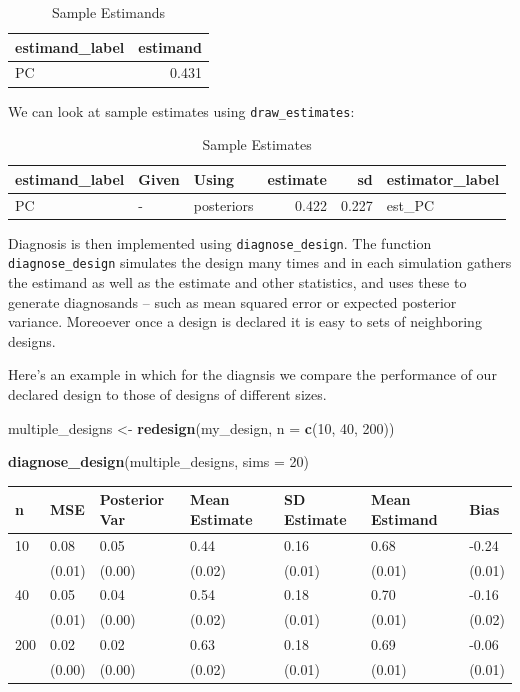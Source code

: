 \documentclass[12pt,]{book}
\newenvironment{Shaded}{\begin{snugshade}}{\end{snugshade}}
\newcommand{\DataTypeTok}[1]{\textcolor[rgb]{0.13,0.29,0.53}{#1}}
\newcommand{\DecValTok}[1]{\textcolor[rgb]{0.00,0.00,0.81}{#1}}
\newcommand{\KeywordTok}[1]{\textcolor[rgb]{0.13,0.29,0.53}{\textbf{#1}}}
\newcommand{\NormalTok}[1]{#1}
\newcommand{\StringTok}[1]{\textcolor[rgb]{0.31,0.60,0.02}{#1}}
\begin{document}
\begin{table}[t]

\caption{\label{tab:unnamed-chunk-54}Sample Estimands}
\centering
\begin{tabular}{l|r}
\hline
estimand\_label & estimand\\
\hline
PC & 0.431\\
\hline
\end{tabular}
\end{table}

We can look at sample estimates using \texttt{draw\_estimates}:

\begin{table}[t]

\caption{\label{tab:unnamed-chunk-55}Sample Estimates}
\centering
\begin{tabular}{l|l|l|r|r|l}
\hline
estimand\_label & Given & Using & estimate & sd & estimator\_label\\
\hline
PC & - & posteriors & 0.422 & 0.227 & est\_PC\\
\hline
\end{tabular}
\end{table}

Diagnosis is then implemented using \texttt{diagnose\_design}. The function \texttt{diagnose\_design} simulates the design many times and in each simulation gathers the estimand as well as the estimate and other statistics, and uses these to generate diagnosands -- such as mean squared error or expected posterior variance. Moreoever once a design is declared it is easy to sets of neighboring designs.

Here's an example in which for the diagnsis we compare the performance of our declared design to those of designs of different sizes.

\begin{Shaded}
\begin{Highlighting}[]
\NormalTok{multiple_designs <-}\StringTok{ }\KeywordTok{redesign}\NormalTok{(my_design, }\DataTypeTok{n =} \KeywordTok{c}\NormalTok{(}\DecValTok{10}\NormalTok{, }\DecValTok{40}\NormalTok{, }\DecValTok{200}\NormalTok{))}

\KeywordTok{diagnose_design}\NormalTok{(multiple_designs, }\DataTypeTok{sims =} \DecValTok{20}\NormalTok{)}
\end{Highlighting}
\end{Shaded}

\begin{tabular}{l|l|l|l|l|l|l}
\hline
n & MSE & Posterior Var & Mean Estimate & SD Estimate & Mean Estimand & Bias\\
\hline
10 & 0.08 & 0.05 & 0.44 & 0.16 & 0.68 & -0.24\\
\hline
 & (0.01) & (0.00) & (0.02) & (0.01) & (0.01) & (0.01)\\
\hline
40 & 0.05 & 0.04 & 0.54 & 0.18 & 0.70 & -0.16\\
\hline
 & (0.01) & (0.00) & (0.02) & (0.01) & (0.01) & (0.02)\\
\hline
200 & 0.02 & 0.02 & 0.63 & 0.18 & 0.69 & -0.06\\
\hline
 & (0.00) & (0.00) & (0.02) & (0.01) & (0.01) & (0.01)\\
\hline
\end{tabular}
\end{document}
